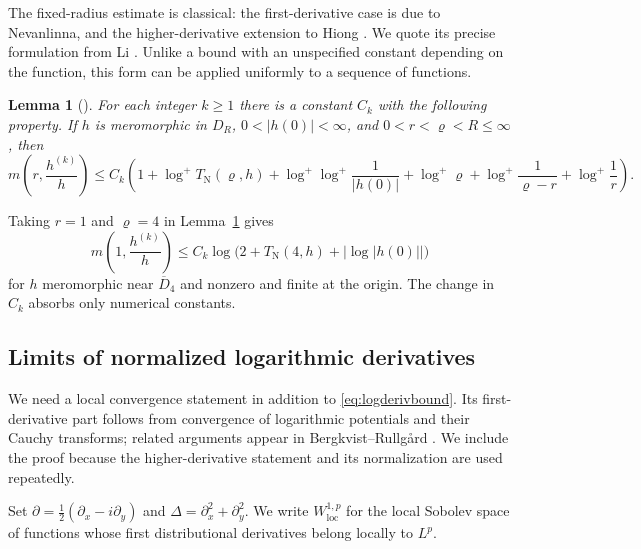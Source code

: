 \documentclass[11pt,letterpaper,reqno]{amsart}
\newtheorem{lem}[thm]{Lemma}
\theoremstyle{remark}
\numberwithin{equation}{section}
\newcommand{\loc}{\mathrm{loc}}
\newcommand{\TN}{T_{\mathrm N}}
\begin{document}
The fixed-radius estimate is classical: the first-derivative case is due to
Nevanlinna, and the higher-derivative extension to Hiong \cite{Hio55}.
We quote its precise formulation from Li \cite[Theorem~A]{Li11}.
Unlike a bound with an unspecified constant depending on the function, this
form can be applied uniformly to a sequence of functions.

\begin{lem}[{\cite[Theorem~A]{Li11}}]\label{lem:NH}
For each integer $k\ge1$ there is a constant $C_k$ with the following
property. If $h$ is meromorphic in $D_R$, $0<|h(0)|<\infty$, and
$0<r<\varrho<R\le\infty$, then
\[
 m\!\left(r,\frac{h^{(k)}}h\right)
 \le C_k\left(1+\log^+\TN(\varrho,h)
 +\log^+\log^+\frac1{|h(0)|}+\log^+\varrho
 +\log^+\frac1{\varrho-r}+\log^+\frac1r\right).
\]
\end{lem}

Taking $r=1$ and $\varrho=4$ in Lemma~\ref{lem:NH} gives
\begin{equation}\label{eq:logderivbound}
 m\!\left(1,\frac{h^{(k)}}h\right)
 \le C_k\log\bigl(2+\TN(4,h)+|\log|h(0)||\bigr)
\end{equation}
for $h$ meromorphic near $\overline D_4$ and nonzero and finite at the origin.
The change in $C_k$ absorbs only numerical constants.

\subsection{Limits of normalized logarithmic derivatives}

We need a local convergence statement in addition to
\eqref{eq:logderivbound}. Its first-derivative part follows from convergence
of logarithmic potentials and their Cauchy transforms; related arguments
appear in Bergkvist--Rullg{\aa}rd \cite[Section~4]{BR02}. We include the proof
because the higher-derivative statement and its normalization are used
repeatedly.

Set $\partial=\tfrac12(\partial_x-i\partial_y)$ and
$\Delta=\partial_x^2+\partial_y^2$. We write $W^{1,p}_{\loc}$ for the local
Sobolev space of functions whose first distributional derivatives belong
locally to $L^p$.
\end{document}
